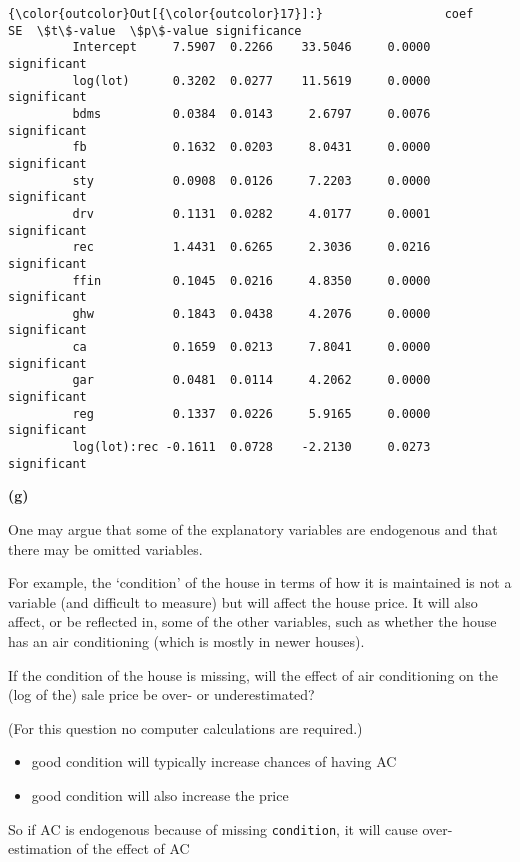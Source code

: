\documentclass[11pt]{article}
\providecommand{\tightlist}{%
      \setlength{\itemsep}{0pt}\setlength{\parskip}{0pt}}
\begin{document}
\begin{Verbatim}[commandchars=\\\{\}]
{\color{outcolor}Out[{\color{outcolor}17}]:}                 coef      SE  \$t\$-value  \$p\$-value significance
         Intercept     7.5907  0.2266    33.5046     0.0000  significant
         log(lot)      0.3202  0.0277    11.5619     0.0000  significant
         bdms          0.0384  0.0143     2.6797     0.0076  significant
         fb            0.1632  0.0203     8.0431     0.0000  significant
         sty           0.0908  0.0126     7.2203     0.0000  significant
         drv           0.1131  0.0282     4.0177     0.0001  significant
         rec           1.4431  0.6265     2.3036     0.0216  significant
         ffin          0.1045  0.0216     4.8350     0.0000  significant
         ghw           0.1843  0.0438     4.2076     0.0000  significant
         ca            0.1659  0.0213     7.8041     0.0000  significant
         gar           0.0481  0.0114     4.2062     0.0000  significant
         reg           0.1337  0.0226     5.9165     0.0000  significant
         log(lot):rec -0.1611  0.0728    -2.2130     0.0273  significant
\end{Verbatim}
            
    \textbf{(g)}

One may argue that some of the explanatory variables are endogenous and
that there may be omitted variables.

For example, the `condition' of the house in terms of how it is
maintained is not a variable (and difficult to measure) but will affect
the house price. It will also affect, or be reflected in, some of the
other variables, such as whether the house has an air conditioning
(which is mostly in newer houses).

If the condition of the house is missing, will the effect of air
conditioning on the (log of the) sale price be over- or underestimated?

(For this question no computer calculations are required.)

    \begin{itemize}
\tightlist
\item
  good condition will typically increase chances of having AC
\item
  good condition will also increase the price
\end{itemize}

So if AC is endogenous because of missing \texttt{condition}, it will
cause over-estimation of the effect of AC
\end{document}
